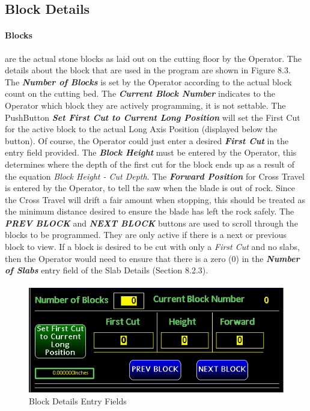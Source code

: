 \subsection{Block Details}\paragraph*{Blocks}are the actual stone blocks as laid out on the cutting floor by the Operator. The details about the block that are used in the program are shown in Figure 8.3. The \textbf{\textit{Number of Blocks}} is set by the Operator according to the actual block count on the cutting bed. The \textbf{\textit{Current Block Number}} indicates to the Operator which block they are actively programming, it is not settable. The PushButton \textbf{\textit{Set First Cut to Current Long Position}} will set the First Cut for the active block to the actual Long Axis Position (displayed below the button). Of course, the Operator could just enter a desired \textbf{\textit{First Cut}} in the entry field provided. The \textbf{\textit{Block Height}} must be entered by the Operator, this determines where the depth of the first cut for the block ends up as a result of the equation \textit{Block Height - Cut Depth}. The \textbf{\textit{Forward Position}} for Cross Travel is entered by the Operator, to tell the saw when the blade is out of rock. Since the Cross Travel will drift a fair amount when stopping, this should be treated as the minimum distance desired to ensure the blade has left the rock safely. The \textbf{\textit{PREV BLOCK}}
 and \textbf{\textit{NEXT BLOCK}} buttons are used to scroll through the blocks to be programmed. They are only active if there is a next or previous block to view. If a block is desired to be cut with only a \textit{First Cut} and no slabs, then the Operator would need to ensure that there is a zero (0) in the \textbf{\textit{Number of Slabs}} entry field of the Slab Details (Section 8.2.3).
	\paragraph{}
		\begin{figure}
			\centering
			\includegraphics[width=.2\linewidth]{screen-captures/program/cut-pgm-block}
			\caption{Block Details Entry Fields}
			\label{fig:cut-pgm-block-entry}
		\end{figure}
